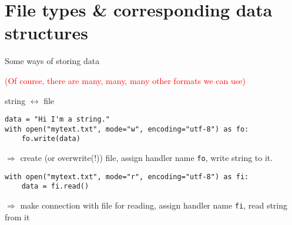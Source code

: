 \section[Files]{File types \& corresponding data structures}


\begin{frame}{Some ways of storing data}
\begin{table}[]
\end{table}
\pause
\textcolor{red}{\footnotesize{(Of course, there are many, many, many other formats we can use)}}
\end{frame}




\begin{frame}[fragile]{string $\leftrightarrow$ file}
\begin{verbatim}
data = "Hi I'm a string."
with open("mytext.txt", mode="w", encoding="utf-8") as fo:
    fo.write(data)
\end{verbatim}
$\Rightarrow$ create (or overwrite(!)) file, assign handler name \texttt{fo}, write string to it.

\pause 
\begin{verbatim}
with open("mytext.txt", mode="r", encoding="utf-8") as fi:
    data = fi.read()
\end{verbatim}

$\Rightarrow$ make connection with file for reading, assign handler name \texttt{fi}, read string from it

\end{frame}




